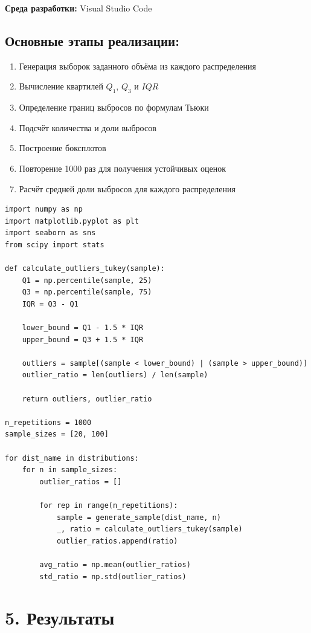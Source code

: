 \documentclass[a4paper,14pt]{extarticle}
\begin{document}
\textbf{Среда разработки:} Visual Studio Code

\subsection*{Основные этапы реализации:}

\begin{enumerate}
    \item Генерация выборок заданного объёма из каждого распределения
    \item Вычисление квартилей $Q_1$, $Q_3$ и $IQR$
    \item Определение границ выбросов по формулам Тьюки
    \item Подсчёт количества и доли выбросов
    \item Построение боксплотов
    \item Повторение 1000 раз для получения устойчивых оценок
    \item Расчёт средней доли выбросов для каждого распределения
\end{enumerate}

\begin{lstlisting}[caption={Вычисление выбросов по методу Тьюки}]
import numpy as np
import matplotlib.pyplot as plt
import seaborn as sns
from scipy import stats

def calculate_outliers_tukey(sample):
    Q1 = np.percentile(sample, 25)
    Q3 = np.percentile(sample, 75)
    IQR = Q3 - Q1
    
    lower_bound = Q1 - 1.5 * IQR
    upper_bound = Q3 + 1.5 * IQR
    
    outliers = sample[(sample < lower_bound) | (sample > upper_bound)]
    outlier_ratio = len(outliers) / len(sample)
    
    return outliers, outlier_ratio

n_repetitions = 1000
sample_sizes = [20, 100]

for dist_name in distributions:
    for n in sample_sizes:
        outlier_ratios = []
        
        for rep in range(n_repetitions):
            sample = generate_sample(dist_name, n)
            _, ratio = calculate_outliers_tukey(sample)
            outlier_ratios.append(ratio)
        
        avg_ratio = np.mean(outlier_ratios)
        std_ratio = np.std(outlier_ratios)
\end{lstlisting}

\section*{5. Результаты}
\end{document}

